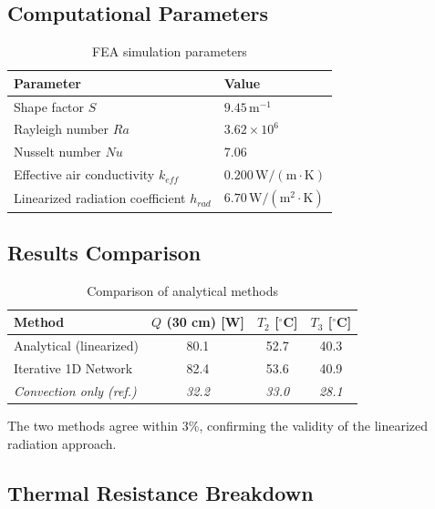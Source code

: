\documentclass[11pt]{article}
\newcommand{\degC}{$^\circ$C}
\newcommand{\unit}[1]{\,\mathrm{#1}}
\begin{document}
\subsection{Computational Parameters}

\begin{table}[H]
\centering
\caption{FEA simulation parameters}
\begin{tabular}{ll}
\toprule
\textbf{Parameter} & \textbf{Value} \\
\midrule
Shape factor $S$ & $9.45\unit{m^{-1}}$ \\
Rayleigh number $Ra$ & $3.62 \times 10^6$ \\
Nusselt number $Nu$ & 7.06 \\
Effective air conductivity $k_{eff}$ & $0.200\unit{W/(m \cdot K)}$ \\
Linearized radiation coefficient $h_{rad}$ & $6.70\unit{W/(m^2 \cdot K)}$ \\
\bottomrule
\end{tabular}
\end{table}

\subsection{Results Comparison}

\begin{table}[H]
\centering
\caption{Comparison of analytical methods}
\begin{tabular}{lccc}
\toprule
\textbf{Method} & \textbf{$Q$ (30 cm) [W]} & \textbf{$T_2$ [\degC]} & \textbf{$T_3$ [\degC]} \\
\midrule
Analytical (linearized) & 80.1 & 52.7 & 40.3 \\
Iterative 1D Network & 82.4 & 53.6 & 40.9 \\
\midrule
\textit{Convection only (ref.)} & \textit{32.2} & \textit{33.0} & \textit{28.1} \\
\bottomrule
\end{tabular}
\end{table}

The two methods agree within 3\%, confirming the validity of the linearized radiation approach.

\subsection{Thermal Resistance Breakdown}
\end{document}
